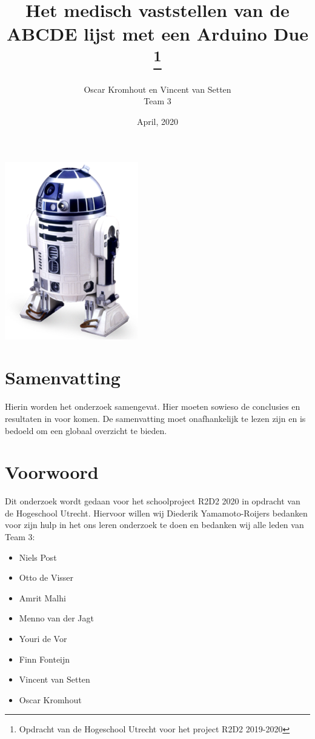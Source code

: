 \documentclass{article}
\title{Het medisch vaststellen van de ABCDE lijst met een Arduino Due \thanks{Opdracht van de Hogeschool Utrecht voor het project R2D2 2019-2020}}
\author{Oscar Kromhout en Vincent van Setten\\ Team 3}
\date{April, 2020}
\begin{document}
\begin{titlepage}
	\centering
	\maketitle
	\includegraphics[scale=2.0]{title.png}
	\clearpage
\end{titlepage}

\tableofcontents
\clearpage
\section{Samenvatting}
Hierin worden het onderzoek samengevat. Hier moeten sowieso de conclusies en resultaten in voor komen. De samenvatting moet onafhankelijk te lezen zijn en is bedoeld om een globaal overzicht te bieden.

\section{Voorwoord}
Dit onderzoek wordt gedaan voor het schoolproject R2D2 2020 in opdracht van de Hogeschool Utrecht. Hiervoor willen wij Diederik Yamamoto-Roijers bedanken voor zijn hulp in het ons leren onderzoek te doen en bedanken wij alle leden van Team 3:
\begin{itemize}
	\item Niels Post
	\item Otto de Visser
	\item Amrit Malhi
	\item Menno van der Jagt
	\item Youri de Vor
	\item Finn Fonteijn
	\item Vincent van Setten
	\item Oscar Kromhout
\end{itemize}
\end{document}
